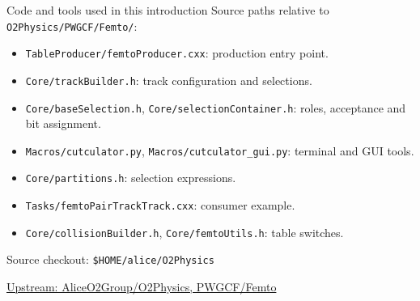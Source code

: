 

\begin{frame}{Code and tools used in this introduction}
        \small Source paths relative to \texttt{O2Physics/PWGCF/Femto/}:
        \begin{itemize}
                \item \texttt{TableProducer/femtoProducer.cxx}:
                        production entry point.
                \item \texttt{Core/trackBuilder.h}: track
                        configuration and selections.
                \item \texttt{Core/baseSelection.h},
                        \texttt{Core/selectionContainer.h}: roles,
                        acceptance and bit assignment.
                \item \texttt{Macros/cutculator.py},
                        \texttt{Macros/cutculator\_gui.py}: terminal
                        and GUI tools.
                \item \texttt{Core/partitions.h}: selection expressions.
                \item \texttt{Tasks/femtoPairTrackTrack.cxx}: consumer example.
                \item \texttt{Core/collisionBuilder.h},
                        \texttt{Core/femtoUtils.h}: table switches.
        \end{itemize}
        \medskip
        Source checkout: \texttt{\$HOME/alice/O2Physics}\par
        \medskip
        \href{https://github.com/AliceO2Group/O2Physics/tree/master/PWGCF/Femto}{Upstream:
        AliceO2Group/O2Physics, PWGCF/Femto}
\end{frame}
